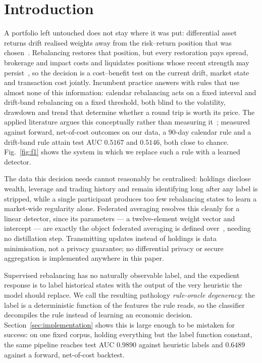 \section{Introduction}
\label{sec:introduction}

A portfolio left untouched does not stay where it was put: differential asset
returns drift realised weights away from the risk--return position that was
chosen~\cite{markowitz1952,sharpe1966}. Rebalancing restores that position, but
every restoration pays spread, brokerage and impact costs and liquidates
positions whose recent strength may persist~\cite{jegadeesh1993}, so the
decision is a cost--benefit test on the current drift, market state and
transaction cost jointly. Incumbent practice answers with rules that use almost
none of this information: calendar rebalancing acts on a fixed interval and
drift-band rebalancing on a fixed threshold, both blind to the volatility,
drawdown and trend that determine whether a round trip is worth its price. The
applied literature argues this conceptually rather than measuring
it~\cite{adedoyin_ai,kumari2024}; measured against forward, net-of-cost outcomes
on our data, a 90-day calendar rule and a drift-band rule attain test AUC
$0.5167$ and $0.5146$, both close to chance. Fig.~\ref{fig:f1} shows the
system in which we replace such a rule with a learned detector.

The data this decision needs cannot reasonably be centralised: holdings
disclose wealth, leverage and trading history and remain identifying long
after any label is stripped, while a single participant produces too few
rebalancing states to learn a market-wide regularity alone. Federated
averaging resolves this cleanly for a linear detector, since its
parameters --- a twelve-element weight vector and intercept --- are exactly
the object federated averaging is defined over~\cite{mcmahan2017}, needing no
distillation step. Transmitting updates instead of holdings is data
minimisation, not a privacy guarantee; no differential privacy or secure
aggregation is implemented anywhere in this paper.

Supervised rebalancing has no naturally observable label, and the expedient
response is to label historical states with the output of the very heuristic
the model should replace. We call the resulting pathology \emph{rule-oracle
degeneracy}: the label is a deterministic function of the features the rule
reads, so the classifier decompiles the rule instead of learning an economic
decision. Section~\ref{sec:implementation} shows this is large enough to be
mistaken for success: on one fixed corpus, holding everything but the label
function constant, the same pipeline reaches test AUC $0.9890$ against
heuristic labels and $0.6489$ against a forward, net-of-cost backtest.

